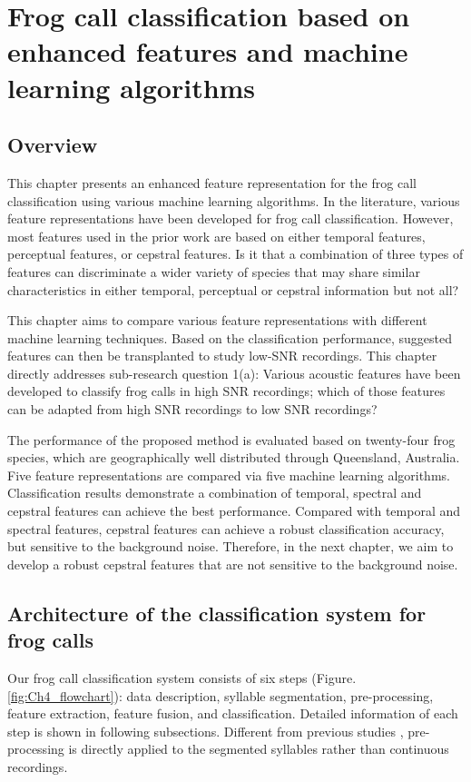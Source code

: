 
\chapter[Frog call classification based on enhanced features]{Frog call classification based on enhanced features and machine learning algorithms}
\label{cha:cha4EnhancedFeature}



\section{Overview}
\label{S:1}

This chapter presents an enhanced feature representation for the frog call classification using various machine learning algorithms. In the literature, various feature representations have been developed for frog call classification. However, most features used in the prior work are based on either temporal features, perceptual features, or cepstral features. Is it that a combination of three types of features can discriminate a wider variety of species that may share similar characteristics in either temporal, perceptual or cepstral information but not all?

This chapter aims to compare various feature representations with different machine learning techniques. Based on the classification performance, suggested features can then be transplanted to study low-SNR recordings. This chapter directly addresses sub-research question 1(a): Various acoustic features have been developed to classify frog calls in high SNR recordings; which of those features can be adapted from high SNR recordings to low SNR recordings?

The performance of the proposed method is evaluated based on twenty-four frog species, which are geographically well distributed through Queensland, Australia. Five feature representations are compared via five machine learning algorithms. Classification results demonstrate a combination of temporal, spectral and cepstral features can achieve the best performance. Compared with temporal and spectral features, cepstral features can achieve a robust classification accuracy, but sensitive to the background noise. Therefore, in the next chapter, we aim to develop a robust cepstral features that are not sensitive to the background noise.



\section{Architecture of the classification system for frog calls}
Our frog call classification system consists of six steps (Figure.~ \ref{fig:Ch4_flowchart}): data description, syllable segmentation, pre-processing,  feature extraction, feature fusion, and classification. Detailed information of each step is shown in following subsections. Different from previous studies \citep{huang2009frog, Xie1504:Acoustic}, pre-processing is directly applied to the segmented syllables rather than continuous recordings.

